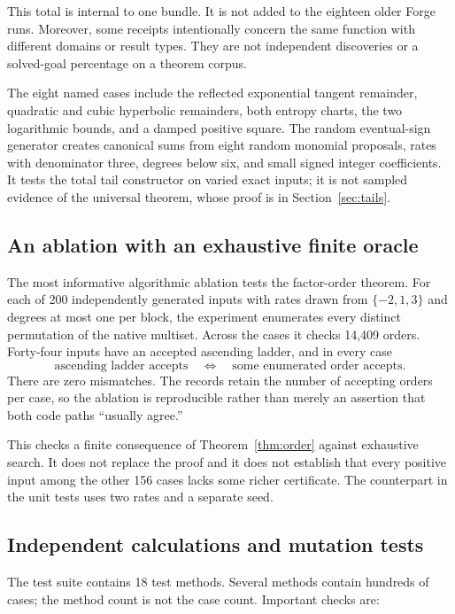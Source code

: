 This total is internal to one bundle. It is not added to the eighteen older
Forge runs. Moreover, some receipts intentionally concern the same function
with different domains or result types. They are not independent discoveries
or a solved-goal percentage on a theorem corpus.

The eight named cases include the reflected exponential tangent remainder,
quadratic and cubic hyperbolic remainders, both entropy charts, the two
logarithmic bounds, and a damped positive square. The random eventual-sign
generator creates canonical sums from eight random monomial proposals, rates
with denominator three, degrees below six, and small signed integer
coefficients. It tests the total tail constructor on varied exact inputs;
it is not sampled evidence of the universal theorem, whose proof is in
Section~\ref{sec:tails}.

\subsection{An ablation with an exhaustive finite oracle}

The most informative algorithmic ablation tests the factor-order theorem.
For each of 200 independently generated inputs with rates drawn from
$\{-2,1,3\}$ and degrees at most one per block, the experiment enumerates every
distinct permutation of the native multiset. Across the cases it checks 14,409
orders. Forty-four inputs have an accepted ascending ladder, and in every case
\[
 \text{ascending ladder accepts}
 \quad\Longleftrightarrow\quad
 \text{some enumerated order accepts}.
\]
There are zero mismatches. The records retain the number of accepting orders
per case, so the ablation is reproducible rather than merely an assertion that
both code paths ``usually agree.''

This checks a finite consequence of Theorem~\ref{thm:order} against exhaustive
search. It does not replace the proof and it does not establish that every
positive input among the other 156 cases lacks some richer certificate. The
counterpart in the unit tests uses two rates and a separate seed.

\subsection{Independent calculations and mutation tests}

The test suite contains 18 test methods. Several methods contain hundreds of
cases; the method count is not the case count. Important checks are:

